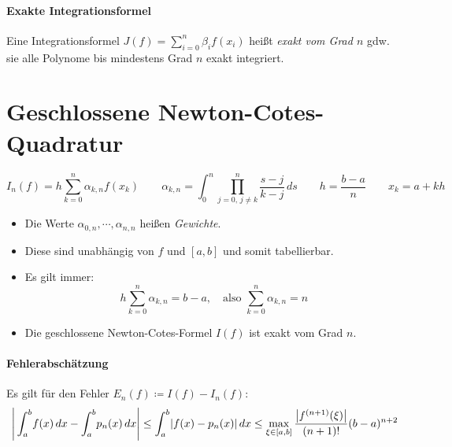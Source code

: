 		\paragraph{Exakte Integrationsformel}
			Eine Integrationsformel \( J(f) = \sum_{i = 0}^{n} \beta_i f(x_i) \) heißt \textit{exakt vom Grad \(n\)} gdw. sie alle Polynome bis mindestens Grad \(n\) exakt integriert.

		\section{Geschlossene Newton-Cotes-Quadratur} %
			\begin{equation*}
				I_n(f) = h \sum_{k=0}^{n} \alpha_{k,n} f(x_k) \qquad \alpha_{k,n} = \int_{0}^{n} \! \prod_{j = 0,\, j \neq k}^{n} \frac{s-j}{k-j} \, ds \qquad h = \frac{b-a}{n} \qquad x_k = a + kh
			\end{equation*}
			\begin{itemize}
				\item Die Werte \( \alpha_{0, n}, \cdots, \alpha_{n, n} \) heißen \textit{Gewichte}.
				\item Diese sind unabhängig von \(f\) und \([a, b]\) und somit tabellierbar.
				\item Es gilt immer:
					\begin{equation*}
						h \sum_{k=0}^{n} \alpha_{k,n} = b - a, \quad\textrm{also } \sum_{k=0}^{n} \alpha_{k, n} = n
					\end{equation*}
				\item Die geschlossene Newton-Cotes-Formel \(I(f)\) ist exakt vom Grad \(n\).
			\end{itemize}

			\paragraph{Fehlerabschätzung}
				Es gilt für den Fehler \( E_n(f) \coloneqq I(f) - I_n(f) \):
				\begin{equation*}
					\Bigg\lvert \int_{a}^{b} \! f(x) \, dx - \int_{a}^{b} \! p_n(x) \, dx \Bigg\rvert \leq \int_{a}^{b} \! \abs{f(x) - p_n(x)} \, dx \leq \max_{\xi \in [a, b]} \frac{\abs{f^{(n + 1)}(\xi)}}{(n + 1)!} (b - a) ^ {n+2}
				\end{equation*}


